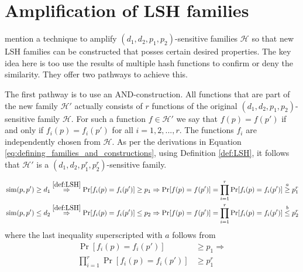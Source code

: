 \section{Amplification of LSH families}
\label{section:lit:amplifying}
\cite{LeskovecRU14} mention a technique to amplify $(d_1,d_2,p_1,p_2)$-sensitive families $\mathcal{H}$ so that new LSH families can be constructed that posses certain desired properties. The key idea here is too use the results of multiple hash functions to confirm or deny the similarity. They offer two pathways to achieve this.

The first pathway is to use an AND-construction. All functions that are part of the new family $\mathcal{H}'$ actually consists of $r$ functions of the original $(d_1,d_2,p_1,p_2)$-sensitive family $\mathcal{H}$. For such a function $f\in\mathcal{H}'$ we say that $f(p)=f(p')$ if and only if $f_i(p)=f_i(p')$ for all $i=1,2,...,r$. The functions $f_i$ are independently chosen from $\mathcal{H}$. As per the derivations in Equation \ref{eq:defining_families_and_constructions}, using Definition \ref{def:LSH}, it follows that $\mathcal{H}'$ is a $(d_1,d_2,p_1^r,p_2^r)$-sensitive family.

\begin{equation}
    \begin{aligned}
        &\operatorname{sim}(p, p') \geq d_1 \stackrel{\ref{def:LSH}}{\Rightarrow} \operatorname{Pr}[f_i(p)=f_i(p')] \geq p_1  \Rightarrow \operatorname{Pr}[f(p)=f(p')] = \prod_{i=1}^{r} \operatorname{Pr}[f_i(p)=f_i(p')]   \stackrel{a}{\geq} p_1^r \\
        &\operatorname{sim}(p, p') \leq d_2 \stackrel{\ref{def:LSH}}{\Rightarrow} \operatorname{Pr}[f_i(p)=f_i(p')] \leq p_2  \Rightarrow \operatorname{Pr}[f(p)=f(p')] = \prod_{i=1}^{r} \operatorname{Pr}[f_i(p)=f_i(p')]  \stackrel{b}{\leq} p_2^r
        \label{eq:defining_families_and_constructions}
    \end{aligned}
\end{equation}
where the last inequality superscripted with $a$ follows from  
\begin{equation}
    \begin{aligned}
    \operatorname{Pr}[f_i(p)=f_i(p')] &\geq p_1 \Rightarrow \\ 
    \prod_{i=1}^{r} \operatorname{Pr}[f_i(p)=f_i(p')] &\geq p_1^r 
    \end{aligned}
\end{equation}

